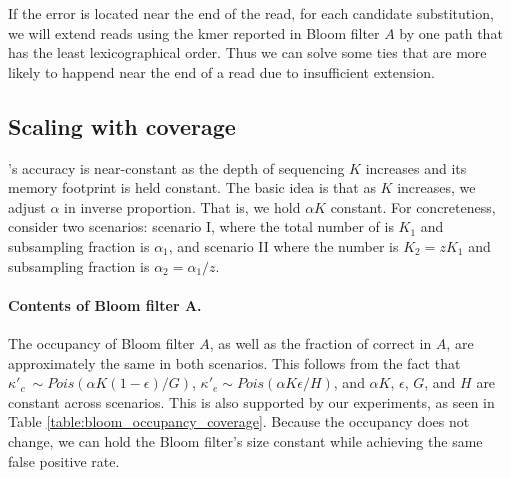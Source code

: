 \documentclass[10pt]{article}
\begin{document}
If the error is located near the end of the read, for each candidate substitution, we will extend reads using the kmer reported in Bloom filter $A$ by one path that has the least lexicographical order. Thus we can solve some ties that are more likely to happend near the end of a read due to insufficient extension. 

\subsection*{Scaling with coverage}
\tool's accuracy is near-constant as the depth of sequencing $K$ increases and its memory footprint is held constant.  The basic idea is that as $K$ increases, we adjust $\alpha$ in inverse proportion.  That is, we hold $\alpha K$ constant.  For concreteness, consider two scenarios: scenario I, where the total number of \kmers is $K_1$ and subsampling fraction is $\alpha_1$, and scenario II where the number is $K_2=z K_1$ and subsampling fraction is $\alpha_2 = \alpha_1 / z$.

\paragraph{Contents of Bloom filter A.} The occupancy of Bloom filter $A$, as well as the fraction of correct \kmers in $A$, are approximately the same in both scenarios.  This follows from the fact that $\kappa'_c ~ \sim Pois(\alpha K (1 - \epsilon) / G)$, $\kappa'_e \sim Pois(\alpha K \epsilon / H)$, and $\alpha K$, $\epsilon$, $G$, and $H$ are constant across scenarios.  This is also supported by our experiments, as seen in Table \ref{table:bloom_occupancy_coverage}.  Because the occupancy does not change, we can hold the Bloom filter's size constant while achieving the same false positive rate.

\end{document}
